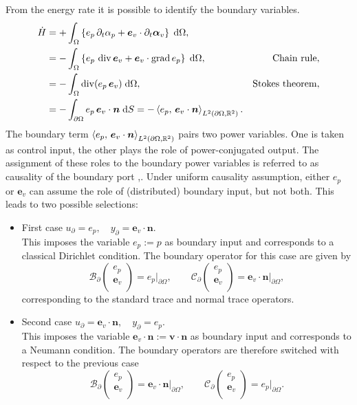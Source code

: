 From the energy rate it is possible to identify the boundary variables. 
\begin{align*}
\dot{H} &= +\int_{\Omega} \left\{ e_p \, \partial_t \alpha_p + \bm{e}_v \cdot \partial_t \bm{\alpha}_v\right\} \d\Omega, \\
 &= -\int_{\Omega} \left\{e_p \, \div \bm{e}_v + \bm{e}_v \cdot \grad e_p \right\}\d\Omega, \qquad &\text{Chain rule}, \\
 &= -\int_{\Omega} \div(e_p \, \bm{e}_v) \d\Omega, \qquad &\text{Stokes theorem}, \\
 &= -\int_{\partial \Omega} e_p \, \bm{e}_v\cdot\bm{n} \d{S} = -\inner[L^2(\partial\Omega, \bbR^2)]{e_p}{\bm{e}_v \cdot\bm{n}}.
\end{align*}
The boundary term $\inner[L^2(\partial\Omega, \bbR^2)]{e_p}{\bm{e}_v\cdot\bm{n}}$ pairs two power variables. One is taken as control input, the other plays the role of power-conjugated output. The assignment of these roles to the boundary power variables is referred to as causality of the boundary port \cite{kotyczka2018weak},\cite[Chapter~2]{kotyczka2019numerical}. Under uniform causality assumption, either $e_p$ or $\bm{e}_v$ can assume the role of (distributed) boundary input, but not both. This leads to two possible selections:
\begin{itemize}
	\item {First case} ${u}_\partial = e_p, \quad {y}_\partial = \bm{e}_v \cdot\bm{n}$. \\
	This imposes the variable $e_p:= p$ as boundary input and corresponds to a classical Dirichlet condition. The boundary operator for this case are given by 
	\[
	\mathcal{B}_\partial \begin{pmatrix}
	e_p \\
	\bm{e}_v \\
	\end{pmatrix} = e_p\vert_{\partial\Omega}, \qquad \mathcal{C}_\partial \begin{pmatrix}
	e_p \\
	\bm{e}_v \\
	\end{pmatrix} = \bm{e}_v\cdot\bm{n}\vert_{\partial\Omega},
	\]
	corresponding to the standard trace and normal trace operators.
	\item {Second case} ${u}_\partial = \bm{e}_v \cdot\bm{n}, \quad {y}_\partial = e_p$. \\
	This imposes the variable $\bm{e}_v \cdot\bm{n}:= \bm{v}\cdot \bm{n}$ as boundary input and corresponds to a Neumann condition. The boundary operators are therefore switched with respect to the previous case
	\[
	\mathcal{B}_\partial \begin{pmatrix}
	e_p \\
	\bm{e}_v \\
	\end{pmatrix} = \bm{e}_v\cdot\bm{n}\vert_{\partial\Omega}, \qquad \mathcal{C}_\partial \begin{pmatrix}
	e_p \\
	\bm{e}_v \\
	\end{pmatrix} = e_p\vert_{\partial\Omega}.
	\]
\end{itemize} 

